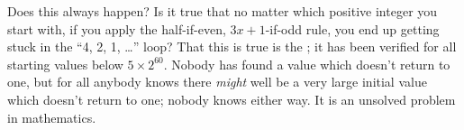 \documentclass{ximera}
\begin{document}
Does this always happen?  Is it true that no matter which positive
integer you start with, if you apply the half-if-even, $3x+1$-if-odd
rule, you end up getting stuck in the ``4, 2, 1, \ldots'' loop?  That
this is true is the ; it has been
verified for all starting values below $5 \times 2^{60}$.  Nobody has
found a value which doesn't return to one, but for all anybody knows
there \textit{might} well be a very large initial value which doesn't
return to one; nobody knows either way.  It is an unsolved
problem in mathematics.
\end{document}
